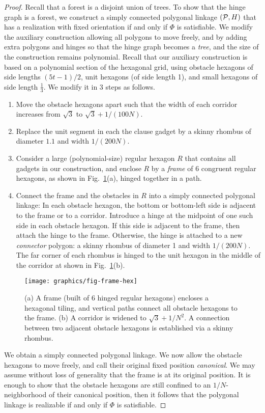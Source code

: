\begin{proof}
Recall that a forest is a disjoint union of trees.  To show that the hinge graph is a forest, we construct a simply connected polygonal linkage $({\cal P},H)$ that has a realization with fixed orientation if and only if $\Phi$ is satisfiable.
We modify the auxiliary construction allowing all polygons to move freely, and by adding extra polygons and hinges so that the hinge graph becomes a \emph{tree}, and the size of the construction remains polynomial. 
Recall that our auxiliary construction is based on a polynomial section of the hexagonal grid, using obstacle hexagons of side lengths $(5t-1)/2$, unit hexagons (of side length 1), and small hexagons of side length $\frac{1}{3}$. 
We modify it in 3 steps as follows.

\begin{enumerate}
\item Move the obstacle hexagons apart such that the width of each corridor increases from $\sqrt{3}$ to $\sqrt{3}+1/(100N)$.
\item Replace the unit segment in each the clause gadget by a skinny rhombus of diameter $1.1$ and width $1/(200N)$.
\item Consider a large (polynomial-size) regular hexagon $R$ that contains all gadgets in our construction, and enclose $R$ by a \emph{frame} of 6 congruent regular hexagons, as shown in Fig.~\ref{fig:frame}(a), hinged together in a path.
\item Connect the frame and the obstacles in $R$ into a simply connected polygonal linkage: In each obstacle hexagon, the bottom or bottom-left side is adjacent to the frame or to a corridor. Introduce a hinge at the midpoint of one such side in each obstacle hexagon. If this side is adjacent to the frame, then attach the hinge to the frame. Otherwise, the hinge is attached to a new \emph{connector} polygon: a skinny rhombus of diameter 1 and width $1/(200N)$. The far corner of each rhombus is hinged to the unit hexagon in the middle of the corridor at shown in Fig.~\ref{fig:frame}(b).
\end{enumerate}

\begin{figure}[htbp]
	\centering
	\texttt{[image: graphics/fig-frame-hex]}
	\caption{(a) A frame (built of 6 hinged regular hexagons) encloses a hexagonal tiling, and
    vertical paths connect all obstacle hexagons to the frame.
    (b) A corridor is widened to $\sqrt{3}+1/N^2$. A connection between
    two adjacent obstacle hexagons is established via a skinny rhombus.}
	\label{fig:frame}
\end{figure}
We obtain a simply connected polygonal linkage. We now allow the obstacle hexagons to move freely, and call their original fixed position \emph{canonical}. 
We may assume without loss of generality that the frame is at its original position. 
It is enough to show that the obstacle hexagons are still confined to an $1/N$-neighborhood of their canonical position, then it
follows that the polygonal linkage is realizable if and only if $\Phi$ is satisfiable.







\end{proof}
